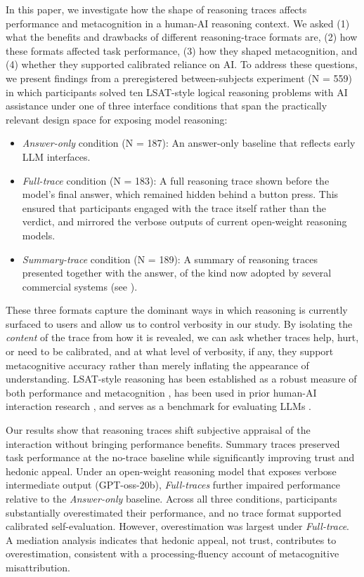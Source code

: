 \documentclass[manuscript, anonymous=false,authorversion,review=false]{acmart}
\begin{document}
In this paper, we investigate how the shape of reasoning traces affects performance and metacognition in a human-AI reasoning context.  We asked (1) what the benefits and drawbacks of different reasoning-trace formats are, (2) how these formats affected task performance, (3) how they shaped metacognition, and (4) whether they supported calibrated reliance on AI. To address these questions, we present findings from a preregistered between-subjects experiment (N = 559) in which participants solved ten LSAT-style logical reasoning problems with AI assistance under one of three interface conditions that span the practically relevant design space for exposing model reasoning:

\begin{itemize}
    \item \textit{Answer-only} condition (N = 187): An answer-only baseline that reflects early LLM interfaces.
    \item \textit{Full-trace} condition (N = 183): A full reasoning trace shown before the model's final answer, which remained hidden behind a button press. This ensured that participants engaged with the trace itself rather than the verdict, and mirrored the verbose outputs of current open-weight reasoning models.
    \item \textit{Summary-trace} condition (N = 189): A summary of reasoning traces presented together with the answer, of the kind now adopted by several commercial systems (see \cite{openai2024learning, anthropic2025extended}).
\end{itemize}

These three formats capture the dominant ways in which reasoning is currently surfaced to users and allow us to control verbosity in our study. By isolating the \textit{content} of the trace from how it is revealed, we can ask whether traces help, hurt, or need to be calibrated, and at what level of verbosity, if any, they support metacognitive accuracy rather than merely inflating the appearance of understanding. LSAT-style reasoning has been established as a robust measure of both performance and metacognition \cite{vaccaro2024combinations}, has been used in prior human-AI interaction research \cite{FERNANDES2026108779}, and serves as a benchmark for evaluating LLMs \cite{katz2024gpt}. 

Our results show that reasoning traces shift subjective appraisal of the interaction without bringing performance benefits. Summary traces preserved task performance at the no-trace baseline while significantly improving trust and hedonic appeal. Under an open-weight reasoning model that exposes verbose intermediate output (GPT-oss-20b), \textit{Full-traces} further impaired performance relative to the \textit{Answer-only} baseline. Across all three conditions, participants substantially overestimated their performance, and no trace format supported calibrated self-evaluation. However, overestimation was largest under \textit{Full-trace}. A mediation analysis indicates that hedonic appeal, not trust, contributes to overestimation, consistent with a processing-fluency account of metacognitive misattribution.
\end{document}
